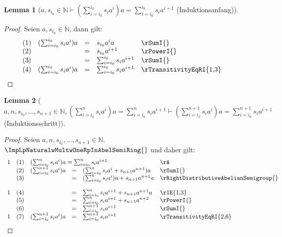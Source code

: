 \documentclass{book}
\theoremstyle{plain}
\newtheorem*{lemma}{Lemma}
\theoremstyle{remark}
\theoremstyle{definition}
\begin{document}
\label{awsSubLbiSubZeroRbInNaturalImpLpSumSubLbiEqualsiSubZeroRbPowerLbiSubZeroRbsSubiaPoweriRpaEqualsSumSubLbiEqualsiSubZeroRbPowerLbiSubZeroRbsSubiaPowerLbiPlusOneRb}
\begin{lemma}[\(a,s_{i_0}\in\mathbb{N}\vdash (\sum_{i=i_0}^{i_0} s_ia^i)a=\sum_{i=i_0}^{i_0} s_ia^{i+1}\) (Induktionsanfang)]
\end{lemma}
\begin{proof}
    Seien \(a,s_{i_0}\in\mathbb{N}\), dann gilt:
    \[
	\begin{array}{llcll p{5cm}}
              &  (1)  & (\sum_{i=i_0}^{i_0} s_ia^i)a &=& s_{i_0}a^ia & \rSumI{} \\
              &  (2)  &  &=& s_{i_0}a^{i+1} & \rPowerI{} \\
              &  (3)  &  &=& \sum_{i=i_0}^{i_0} s_ia^{i+1} & \rSumI{} \\
              &  (4)  &  (\sum_{i=i_0}^{i_0} s_ia^i)a&=& \sum_{i=i_0}^{i_0} s_ia^{i+1} & \rTransitivityEqRI{1,3} \\
        \end{array}
    \]
\end{proof}

\label{awnwsSubLbiSubZeroRbwDotswsSubLbnPlusOneRbInNaturalwLpSumSubLbiEqualsiSubZeroRbPowerLbnRbsSubiaPoweriRpaEqualsSumSubLbiEqualsiSubZeroRbPowerLbnRbsSubiaPowerLbiPlusOneRbImpLpSumSubLbiEqualsiSubZeroRbPowerLbnPlusOneRbsSubiaPoweriRpaEqualsSumSubLbiEqualsiSubZeroRbPowerLbnPlusOneRbsSubiaPowerLbiPlusOneRb}
\begin{lemma}[\(a,n,s_{i_0},\dots,s_{n+1}\in\mathbb{N},(\sum_{i=i_0}^{n} s_ia^i)a=\sum_{i=i_0}^{n} s_ia^{i+1}\vdash (\sum_{i=i_0}^{n+1} s_ia^i)a=\sum_{i=i_0}^{n+1} s_ia^{i+1}\) (Induktionsschritt)]
\end{lemma}
\begin{proof}
    Seien \(a,n,s_{i_0},\dots,s_{n+1}\in\mathbb{N}\). \(\ImpLpNaturalwMultwOneRpInAbelSemiRing{}\) und daher gilt:
    \[
	\begin{array}{llcll p{5cm}}
            1 &  (1)  & \multicolumn{3}{l}{(\sum_{i=i_0}^{n} s_ia^i)a=\sum_{i=i_0}^{n} s_ia^{i+1}} & \rA \\
              &  (2)  & (\sum_{i=i_0}^{n+1} s_ia^i)a &=& (\sum_{i=i_0}^{n} s_ia^i+s_{n+1}a^{n+1})a & \rSumI{} \\
              &  (3)  &  &=& (\sum_{i=i_0}^{n} s_ia^i)a+s_{n+1}a^{n+1}a & \rRightDistributiveAbelianSemigroup{} \\
            1 &  (4)  &  &=& \sum_{i=i_0}^{n} s_ia^{i+1}+s_{n+1}a^{n+1}a & \rIE{1,3} \\
              &  (5)  &  &=& \sum_{i=i_0}^{n} s_ia^{i+1}+s_{n+1}a^{n+2} & \rPowerI{} \\
              &  (6)  &  &=& \sum_{i=i_0}^{n+1} s_ia^{i+1} & \rSumI{} \\
            1 &  (7)  & (\sum_{i=i_0}^{n+1} s_ia^i)a &=& \sum_{i=i_0}^{n+1} s_ia^{i+1} & \rTransitivityEqRI{2,6} \\
        \end{array}
    \]
\end{proof}
\end{document}

